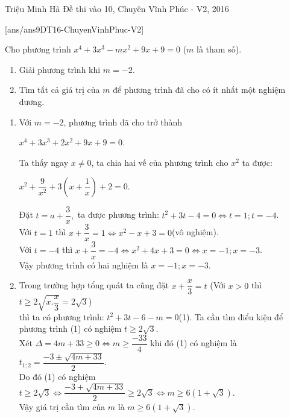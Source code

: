\begin{name}
{Triệu Minh Hà}
{Đề thi vào 10, Chuyên Vĩnh Phúc - V2, 2016}
\end{name}
\setcounter{ex}{0}
[ans/ans9DT16-ChuyenVinhPhuc-V2]
\begin{ex}%
Cho phương trình $x^4+3x^3-mx^2+9x+9=0$ ($m$ là tham số).
\begin{enumerate}
\item Giải phương trình khi $m=-2$.
\item Tìm tất cả giá trị của $m$ để phương trình đã cho có ít nhất một nghiệm dương.
\end{enumerate}
\loigiai
   {\begin{enumerate}
   		\item Với $m=-2$, phương trình đã cho trở thành
   		\begin{center}
   			$x^4+3x^3+2x^2+9x+9=0$.
   		\end{center}
   	Ta thấy ngay $x\neq 0$, ta chia hai vế của phương trình cho $x^2$ ta được:
   	\begin{center}
   		$x^2+\dfrac{9}{x^2}+3\left( x+\dfrac{1}{x}\right) +2=0$.
   	\end{center}
   	Đặt $t=a+\dfrac{3}{x}, $ ta được phương trình: $t^2+3t-4=0\Leftrightarrow t=1;t=-4$.\\
   	Với $t=1$ thì $x+\dfrac{3}{x}=1\Leftrightarrow x^2-x+3=0$(vô nghiệm).\\
   	Với $t=-4$ thì $x+\dfrac{3}{x}=-4\Leftrightarrow x^2+4x+3=0\Leftrightarrow x=-1;x=-3$.\\
   	Vậy phương trình có hai nghiệm là $x=-1;x=-3$.
   	\item  Trong trường hợp tổng quát ta cũng đặt $x+\dfrac{x}{3}=t$ (Với $x>0$ thì $t\geq 2\sqrt{x.\dfrac{x}{3}}=2\sqrt{3}$) \\thì ta có phương trình: $t^2+3t-6-m=0$(1).
   	Ta cần tìm điểu kiện để phương trình (1) có nghiệm $t\geq 2\sqrt{3}$.\\
   	Xét $\Delta=4m+33\geq 0\Leftrightarrow m\geq \dfrac{-33}{4}$ khi đó (1) có nghiệm là $t_{1;2}=\dfrac{-3\pm\sqrt{4m+33}}{2}$.\\
   	Do đó (1) có nghiệm $t\geq 2\sqrt{3}\Leftrightarrow \dfrac{-3+\sqrt{4m+33}}{2}\geq 2\sqrt{3}\Leftrightarrow m\geq 6(1+\sqrt{3}).$\\
   	Vậy giá trị cần tìm của $m$ là $m\geq 6(1+\sqrt{3})$.
   	\end{enumerate}
} 
\end{ex}

